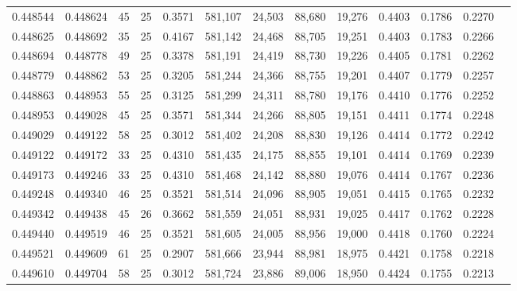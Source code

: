 \begin{tabular}{rrrrrrrrrrrrr}
0.448544 & 0.448624 &    45 &  25 &                                     0.3571 & 581,107 &  24,503 &  88,680 &  19,276 & 0.4403 & 0.1786 & 0.2270 \\
0.448625 & 0.448692 &    35 &  25 &                                     0.4167 & 581,142 &  24,468 &  88,705 &  19,251 & 0.4403 & 0.1783 & 0.2266 \\
0.448694 & 0.448778 &    49 &  25 &                                     0.3378 & 581,191 &  24,419 &  88,730 &  19,226 & 0.4405 & 0.1781 & 0.2262 \\
0.448779 & 0.448862 &    53 &  25 &                                     0.3205 & 581,244 &  24,366 &  88,755 &  19,201 & 0.4407 & 0.1779 & 0.2257 \\
0.448863 & 0.448953 &    55 &  25 &                                     0.3125 & 581,299 &  24,311 &  88,780 &  19,176 & 0.4410 & 0.1776 & 0.2252 \\
0.448953 & 0.449028 &    45 &  25 &                                     0.3571 & 581,344 &  24,266 &  88,805 &  19,151 & 0.4411 & 0.1774 & 0.2248 \\
0.449029 & 0.449122 &    58 &  25 &                                     0.3012 & 581,402 &  24,208 &  88,830 &  19,126 & 0.4414 & 0.1772 & 0.2242 \\
0.449122 & 0.449172 &    33 &  25 &                                     0.4310 & 581,435 &  24,175 &  88,855 &  19,101 & 0.4414 & 0.1769 & 0.2239 \\
0.449173 & 0.449246 &    33 &  25 &                                     0.4310 & 581,468 &  24,142 &  88,880 &  19,076 & 0.4414 & 0.1767 & 0.2236 \\
0.449248 & 0.449340 &    46 &  25 &                                     0.3521 & 581,514 &  24,096 &  88,905 &  19,051 & 0.4415 & 0.1765 & 0.2232 \\
0.449342 & 0.449438 &    45 &  26 &                                     0.3662 & 581,559 &  24,051 &  88,931 &  19,025 & 0.4417 & 0.1762 & 0.2228 \\
0.449440 & 0.449519 &    46 &  25 &                                     0.3521 & 581,605 &  24,005 &  88,956 &  19,000 & 0.4418 & 0.1760 & 0.2224 \\
0.449521 & 0.449609 &    61 &  25 &                                     0.2907 & 581,666 &  23,944 &  88,981 &  18,975 & 0.4421 & 0.1758 & 0.2218 \\
0.449610 & 0.449704 &    58 &  25 &                                     0.3012 & 581,724 &  23,886 &  89,006 &  18,950 & 0.4424 & 0.1755 & 0.2213 \\

\end{tabular}
